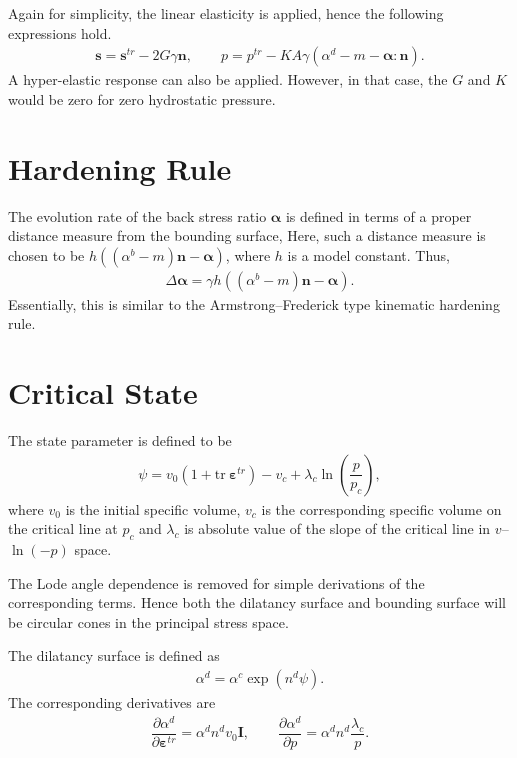 \documentclass[11pt,fleqn]{article}
\newcommand*{\tr}[1]{\mathrm{tr}~#1}
\newcommand*{\pfrac}[2]{\dfrac{\partial#1}{\partial#2}}
\begin{document}
Again for simplicity, the linear elasticity is applied, hence the following expressions hold.
\begin{gather*}
\mathbold{s}=\mathbold{s}^{tr}-2G\gamma\mathbold{n},\qquad
p=p^{tr}-KA\gamma\left(\alpha^d-m-\mathbold{\alpha}:\mathbold{n}\right).
\end{gather*}
A hyper-elastic response can also be applied. However, in that case, the $G$ and $K$ would be zero for zero hydrostatic pressure.
\section{Hardening Rule}
The evolution rate of the back stress ratio $\mathbold{\alpha}$ is defined in terms of a proper distance measure from the bounding surface, Here, such a distance measure is chosen to be $h\left(\left(\alpha^b-m\right)\mathbold{n}-\mathbold{\alpha}\right)$, where $h$ is a model constant. Thus,
\begin{gather*}
\Delta\mathbold{\alpha}=\gamma{}h\left(\left(\alpha^b-m\right)\mathbold{n}-\mathbold{\alpha}\right).
\end{gather*}
Essentially, this is similar to the Armstrong--Frederick type kinematic hardening rule.
\section{Critical State}
The state parameter is defined to be
\begin{gather*}
\psi=v_0\left(1+\tr{\mathbold{\varepsilon}^{tr}}\right)-v_c+\lambda_c\ln\left(\dfrac{p}{p_c}\right),
\end{gather*}
where $v_0$ is the initial specific volume, $v_c$ is the corresponding specific volume on the critical line at $p_c$ and $\lambda_c$ is absolute value of the slope of the critical line in $v$--$\ln(-p)$ space.

The Lode angle dependence is removed for simple derivations of the corresponding terms. Hence both the dilatancy surface and bounding surface will be circular cones in the principal stress space.

The dilatancy surface is defined as
\begin{gather*}
\alpha^d=\alpha^c\exp\left(n^d\psi\right).
\end{gather*}
The corresponding derivatives are
\begin{gather*}
\pfrac{\alpha^d}{\mathbold{\varepsilon}^{tr}}=\alpha^dn^dv_0\mathbold{I},\qquad
\pfrac{\alpha^d}{p}=\alpha^dn^d\dfrac{\lambda_c}{p}.
\end{gather*}
\end{document}
